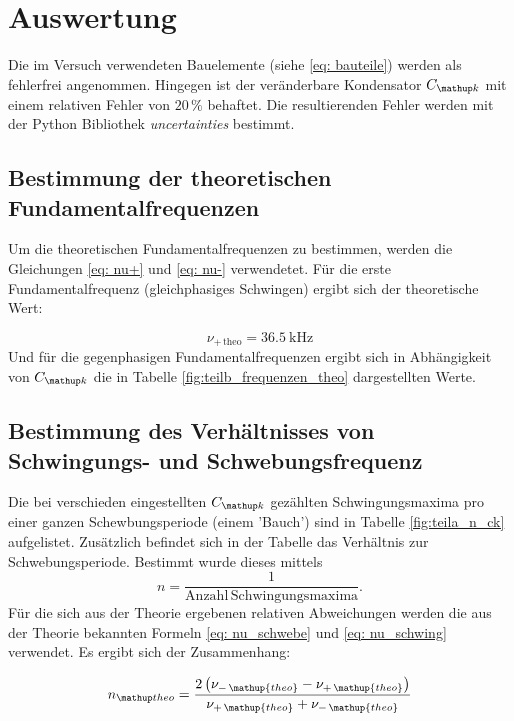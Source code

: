 \section{Auswertung}
Die im Versuch verwendeten Bauelemente (siehe \eqref{eq: bauteile})
werden als fehlerfrei angenommen.
Hingegen ist der veränderbare Kondensator $C\ua{k}$ mit
einem relativen Fehler von $20\,\%$ behaftet.
Die resultierenden Fehler werden mit der Python Bibliothek
\emph{uncertainties} bestimmt.

\subsection{Bestimmung der theoretischen Fundamentalfrequenzen}
Um die theoretischen Fundamentalfrequenzen zu bestimmen, werden die Gleichungen \eqref{eq: nu+} und
\eqref{eq: nu-} verwendetet.
Für die erste Fundamentalfrequenz (gleichphasiges Schwingen) ergibt sich der
theoretische Wert: %

\begin{equation}
\label{eq:nu_plu_theo}
\nu_{+\,\mathup{theo}}=\SI{36,5}{\kilo\hertz}
\end{equation}
Und für die gegenphasigen Fundamentalfrequenzen ergibt sich in Abhängigkeit von $C\ua{k}$ die in Tabelle \ref{fig:teilb_frequenzen_theo}  dargestellten Werte. %


\subsection{Bestimmung des Verhältnisses von Schwingungs- und Schwebungsfrequenz}
Die bei verschieden eingestellten $C\ua{k}$ gezählten Schwingungsmaxima pro einer ganzen %
Schewbungsperiode (einem 'Bauch') sind in Tabelle \ref{fig:teila_n_ck} aufgelistet. %
Zusätzlich befindet sich in der Tabelle das Verhältnis zur Schwebungsperiode. %
Bestimmt wurde dieses mittels %
\begin{equation*}
n=\frac{1}{\mathup{Anzahl \, Schwingungsmaxima}}.
\end{equation*}
Für die sich aus der Theorie ergebenen relativen Abweichungen werden die aus der Theorie
bekannten Formeln \eqref{eq: nu_schwebe} und \eqref{eq: nu_schwing} verwendet.
Es ergibt sich der Zusammenhang:

\begin{equation*}
n\ua{theo}=\frac{2\left(\nu_{-\,\mathup{theo}}-\nu_{+\,\mathup{theo}}\right)}{\nu_{+\,\mathup{theo}}+\nu_{-\,\mathup{theo}}}
\end{equation*}


